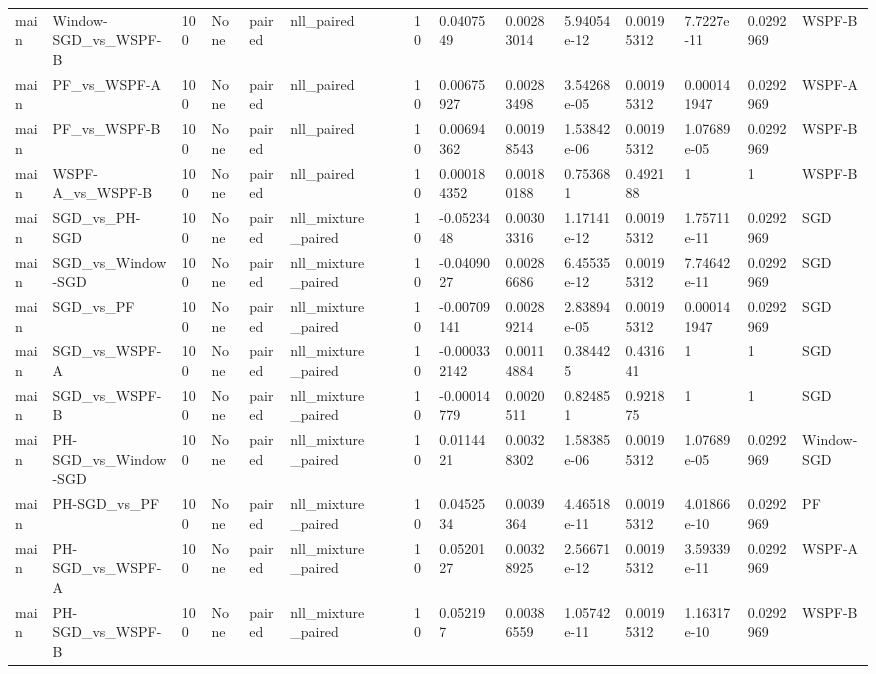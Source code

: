 \begin{tabular}{llllllllllllllll}
main & Window-SGD\_vs\_WSPF-B & 100 & None & paired & nll\_paired &  &  & 10 & 0.0407549 & 0.00283014 & 5.94054e-12 & 0.00195312 & 7.7227e-11 & 0.0292969 & WSPF-B \\
main & PF\_vs\_WSPF-A & 100 & None & paired & nll\_paired &  &  & 10 & 0.00675927 & 0.00283498 & 3.54268e-05 & 0.00195312 & 0.000141947 & 0.0292969 & WSPF-A \\
main & PF\_vs\_WSPF-B & 100 & None & paired & nll\_paired &  &  & 10 & 0.00694362 & 0.00198543 & 1.53842e-06 & 0.00195312 & 1.07689e-05 & 0.0292969 & WSPF-B \\
main & WSPF-A\_vs\_WSPF-B & 100 & None & paired & nll\_paired &  &  & 10 & 0.000184352 & 0.00180188 & 0.753681 & 0.492188 & 1 & 1 & WSPF-B \\
main & SGD\_vs\_PH-SGD & 100 & None & paired & nll\_mixture\_paired &  &  & 10 & -0.0523448 & 0.00303316 & 1.17141e-12 & 0.00195312 & 1.75711e-11 & 0.0292969 & SGD \\
main & SGD\_vs\_Window-SGD & 100 & None & paired & nll\_mixture\_paired &  &  & 10 & -0.0409027 & 0.00286686 & 6.45535e-12 & 0.00195312 & 7.74642e-11 & 0.0292969 & SGD \\
main & SGD\_vs\_PF & 100 & None & paired & nll\_mixture\_paired &  &  & 10 & -0.00709141 & 0.00289214 & 2.83894e-05 & 0.00195312 & 0.000141947 & 0.0292969 & SGD \\
main & SGD\_vs\_WSPF-A & 100 & None & paired & nll\_mixture\_paired &  &  & 10 & -0.000332142 & 0.00114884 & 0.384425 & 0.431641 & 1 & 1 & SGD \\
main & SGD\_vs\_WSPF-B & 100 & None & paired & nll\_mixture\_paired &  &  & 10 & -0.00014779 & 0.0020511 & 0.824851 & 0.921875 & 1 & 1 & SGD \\
main & PH-SGD\_vs\_Window-SGD & 100 & None & paired & nll\_mixture\_paired &  &  & 10 & 0.0114421 & 0.00328302 & 1.58385e-06 & 0.00195312 & 1.07689e-05 & 0.0292969 & Window-SGD \\
main & PH-SGD\_vs\_PF & 100 & None & paired & nll\_mixture\_paired &  &  & 10 & 0.0452534 & 0.0039364 & 4.46518e-11 & 0.00195312 & 4.01866e-10 & 0.0292969 & PF \\
main & PH-SGD\_vs\_WSPF-A & 100 & None & paired & nll\_mixture\_paired &  &  & 10 & 0.0520127 & 0.00328925 & 2.56671e-12 & 0.00195312 & 3.59339e-11 & 0.0292969 & WSPF-A \\
main & PH-SGD\_vs\_WSPF-B & 100 & None & paired & nll\_mixture\_paired &  &  & 10 & 0.052197 & 0.00386559 & 1.05742e-11 & 0.00195312 & 1.16317e-10 & 0.0292969 & WSPF-B \\

\end{tabular}
